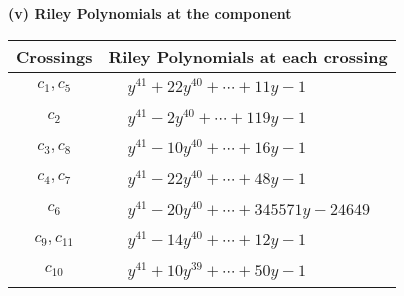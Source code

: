 \documentclass[1p]{elsarticle_modified}
\theoremstyle{definition}
\begin{document}
\flushleft \textbf{(v) Riley Polynomials at the component}\newline \\
\begin{tabular}{m{50pt}|m{274pt}}
Crossings & \hspace{64pt}Riley Polynomials at each crossing \\
\hline $$\begin{aligned}c_{1},c_{5}\end{aligned}$$&$\begin{aligned}
&y^{41}+22 y^{40}+\cdots+11 y-1
\end{aligned}$\\
\hline $$\begin{aligned}c_{2}\end{aligned}$$&$\begin{aligned}
&y^{41}-2 y^{40}+\cdots+119 y-1
\end{aligned}$\\
\hline $$\begin{aligned}c_{3},c_{8}\end{aligned}$$&$\begin{aligned}
&y^{41}-10 y^{40}+\cdots+16 y-1
\end{aligned}$\\
\hline $$\begin{aligned}c_{4},c_{7}\end{aligned}$$&$\begin{aligned}
&y^{41}-22 y^{40}+\cdots+48 y-1
\end{aligned}$\\
\hline $$\begin{aligned}c_{6}\end{aligned}$$&$\begin{aligned}
&y^{41}-20 y^{40}+\cdots+345571 y-24649
\end{aligned}$\\
\hline $$\begin{aligned}c_{9},c_{11}\end{aligned}$$&$\begin{aligned}
&y^{41}-14 y^{40}+\cdots+12 y-1
\end{aligned}$\\
\hline $$\begin{aligned}c_{10}\end{aligned}$$&$\begin{aligned}
&y^{41}+10 y^{39}+\cdots+50 y-1
\end{aligned}$\\
\hline
\end{tabular}\\~\\
\end{document}
